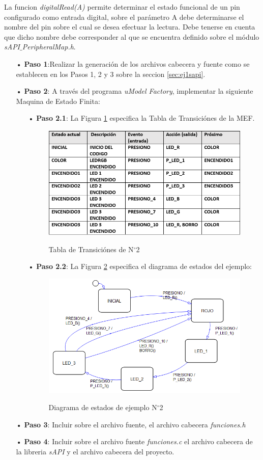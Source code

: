 \documentclass[12pt,letterpaper]{article}
\begin{document}
La funcion \textit{digitalRead(A)} permite determinar el estado funcional de un pin configurado como entrada digital, sobre el parámetro A debe determinarse el nombre del pin sobre el cual se desea efectuar la lectura. Debe tenerse en cuenta que dicho nombre debe corresponder al que se encuentra definido sobre el módulo \textit{sAPI$\_$PeripheralMap.h}.

\begin{enumerate}
\item[•]\textbf{Paso 1}:Realizar la generación de los archivos cabecera y fuente como se establecen en los Pasos 1, 2 y 3 sobre la seccion \ref{sec:ej1sapi}.

\item[•]\textbf{Paso 2}: A través del programa \textit{uModel Factory}, implementar la siguiente Maquina de Estado Finita:

\begin{enumerate}
\item[•]\textbf{Paso 2.1}: La Figura \ref{tablatransicionej2} especifica la Tabla de Transiciónes de la MEF.
\begin{figure}[H]
\centering
\includegraphics[width=8 cm]{figuras/f45.png}\\
\caption{Tabla de Transiciónes de N$^{\circ}$2}
\label{tablatransicionej2}
\end{figure}
\item[•]\textbf{Paso 2.2}: La Figura \ref{Fig22} especifica el diagrama de estados del ejemplo:

\begin{figure}[H]
\centering
\includegraphics[width=8 cm]{figuras/f4.png}\\
\caption{Diagrama de estados de ejemplo N$^{\circ}$2}
\label{Fig22}
\end{figure}
\end{enumerate}

\item[•]\textbf{Paso 3}: Incluir sobre el archivo fuente, el archivo cabecera \textit{funciones.h}

\item[•]\textbf{Paso 4}: Incluir sobre el archivo fuente \textit{funciones.c} el archivo cabecera de la libreria \textit{sAPI} y el archivo cabecera del proyecto.

\end{enumerate}
\end{document}
